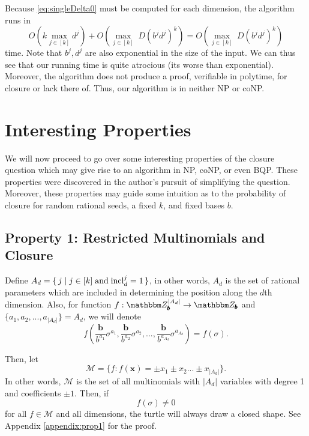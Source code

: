 \documentclass[11pt,titlepage]{article}
\newcommand{\inclIndic}[2]{{\mathrm{incl}_{#1}^{#2}}}
\newcommand{\digSumPeriodicNoJ}{{\sigma}}
\newcommand{\commonBase}{{\pmb{b}}}
\newcommand{\numbToCommonNoJ}[1]{\frac{\commonBase}{b^{#1}}}
\begin{document}
Because \eqref{eq:singleDelta0} must be computed for each dimension, the algorithm
runs in 
$$
  O\left(k \max_{j \in [k]} d^j \right) + 
  O\left(\max_{j \in [k]} \; D (b^j d^j)^k \right) = 
  O\left(\max_{j \in [k]} \; D (b^j d^j)^k \right)
$$
time.
Note that $b^j, d^j$ are also exponential in the size of the input. 
We can thus see that our running time is quite atrocious (its worse than exponential).
Moreover, the algorithm does not produce a proof, verifiable in polytime, for closure 
or lack there of. Thus, our algorithm is in neither NP or coNP.

\section{Interesting Properties}
We will now proceed to go over some interesting properties of the closure question
which may give rise to an algorithm in NP, coNP, or even BQP. These properties were discovered
in the author's pursuit of simplifying the question. Moreover, these properties may guide
some intuition as to the probability of closure for random rational seeds, a fixed $k$, 
and fixed bases $b$.

\subsection{Property 1: Restricted Multinomials and Closure}
\label{prop:1}
Define $A_d = \set{j \mid j \in [k] \; \text{and}\; \inclIndic{d}{j} = 1}$, in other words,
$A_d$ is the set of rational parameters which are included in determining the position along the $d$th dimension.
Also, for function $f: \Z_\commonBase^{|A_d|} \rightarrow \Z_\commonBase$ and $\{a_1, a_2, ..., a_{|A_d|} \} = A_d$, we will denote
$$
  f\left(\numbToCommonNoJ{a_1} \digSumPeriodicNoJ^{a_1}, \numbToCommonNoJ{a_2}\digSumPeriodicNoJ^{a_2}, ..., \numbToCommonNoJ{a_{A_d}}\digSumPeriodicNoJ^{a_{A_d}}\right)
  = f\left(\digSumPeriodicNoJ\right).
$$

Then, let
$$
\mathcal{M} = \{f : f(\pmb{x}) = \pm x_1 \pm x_2 ... \pm x_{|A_d|}\}.
$$
In other words, $\mathcal{M}$ is the set of all multinomials with $|A_d|$ variables with
degree 1 and coefficients $\pm1$.
Then,
if \begin{equation}
\label{eq:satisfy-multi}
f\left(\digSumPeriodicNoJ\right) \neq 0
\end{equation}
for all $f \in \mathcal{M}$ and all dimensions, the turtle will always draw a closed shape. See 
Appendix \ref{appendix:prop1} for the proof.
\end{document}
